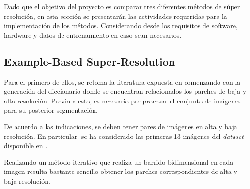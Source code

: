 \noindent
Dado que el objetivo del proyecto es comparar tres diferentes métodos 
de súper resolución, en esta sección se presentarán las actividades
requeridas para la implementación de los métodos. Considerando desde los 
requisitos de software, hardware y datos de entrenamiento en caso sean 
necesarios. 

\subsection{Example-Based Super-Resolution}
\noindent
Para el primero de ellos, se retoma la literatura expuesta en \cite{freeman}
comenzando con la generación del diccionario donde se encuentran relacionados 
los parches de baja y alta resolución. Previo a esto, es necesario pre-procesar
el conjunto de imágenes para su posterior segmentación. 

De acuerdo a las indicaciones, se deben tener pares de imágenes en alta y baja 
resolución. En particular, se ha considerado las primeras 13 imágenes del 
\emph{dataset} disponible en \cite{MIRFLICKR}.

Realizando un método iterativo que realiza un barrido bidimensional en cada imagen
resulta bastante sencillo obtener los parches correspondientes de alta y baja resolución. 
